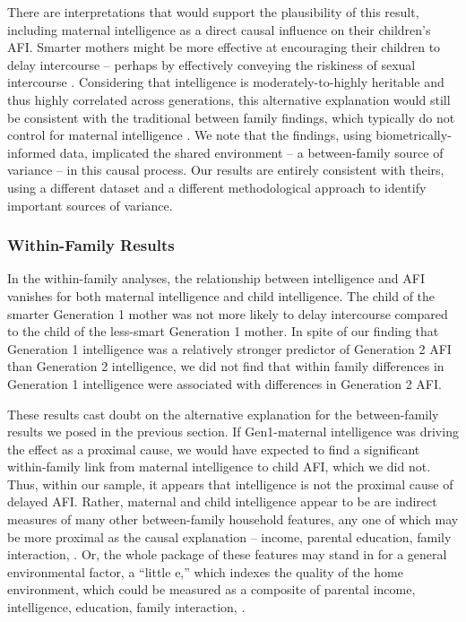 There are interpretations that would support the plausibility of this result, including maternal intelligence as a direct causal influence on their children's AFI. Smarter mothers might be more effective at encouraging their children to delay intercourse -- perhaps by effectively conveying the riskiness of sexual intercourse \citep{hutchinson2003role,mathews2009predictors}. Considering that intelligence is moderately-to-highly heritable \citep{Bouchard2004} and thus highly correlated across generations, this alternative explanation would still be consistent with the traditional between family findings, which typically do not control for maternal intelligence \citep{halpern2000smart,mott1983early,Paul2000,Woodward2001}. We note that the \citet{harden2011don} findings, using biometrically-informed data, implicated the shared environment -- a between-family source of variance -- in this causal process. Our results are entirely consistent with theirs, using a different dataset and a different methodological approach to identify important sources of variance.
 
\subsubsection{Within-Family Results} In the within-family analyses, the relationship between intelligence and AFI vanishes for both maternal intelligence and child intelligence. The child of the smarter Generation 1 mother was not more likely to delay intercourse compared to the child of the less-smart Generation 1 mother. In spite of our finding that Generation 1 intelligence was a relatively stronger predictor of Generation 2 AFI than Generation 2 intelligence, we did not find that within family differences in Generation 1 intelligence were associated with differences in Generation 2 AFI.

These results cast doubt on the alternative explanation for the between-family results we posed in the previous section. If Gen1-maternal intelligence was driving the effect as a proximal cause, we would have expected to find a significant within-family link from maternal intelligence to child AFI, which we did not. Thus, within our sample, it appears that intelligence is not the proximal cause of delayed AFI. Rather, maternal and child intelligence appear to be are indirect measures of many other between-family household features, any one of which may be more proximal as the causal explanation -- income, parental education, family interaction, \etc. Or, the whole package of these features may stand in for a general environmental factor, a ``little e,'' which indexes the quality of the home environment, which could be measured as a composite of parental income, intelligence, education, family interaction, \etc.
%
